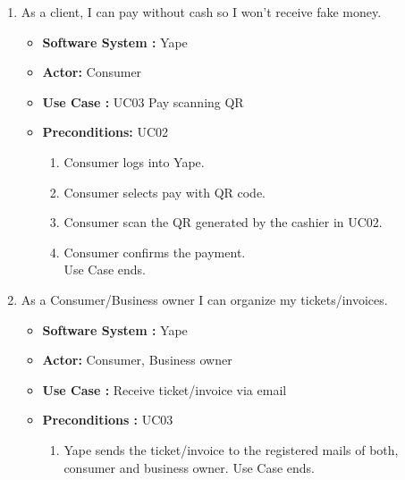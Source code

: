 \documentclass{article}
\begin{document}
\begin{enumerate}
    
   \item  As a client, I can pay without cash so I won't receive fake money. 
   \begin{itemize}
        \item \textbf{Software System : } Yape 
        \item \textbf{Actor: } Consumer 
        \item \textbf{Use Case : } UC03 Pay scanning QR
        \item \textbf{Preconditions: } UC02
	\begin{enumerate}
            \item Consumer logs into Yape.
	    \item Consumer selects pay with QR code.
	    \item Consumer scan the QR generated by the cashier in UC02.
	    \item Consumer confirms the payment.\\
            Use Case ends.
        \end{enumerate}
    \end{itemize}

   \item As a Consumer/Business owner I can organize my tickets/invoices.
   \begin{itemize}
        \item \textbf{Software System :} Yape 
        \item \textbf{Actor: } Consumer, Business owner
        \item \textbf{Use Case : } Receive ticket/invoice via email
        \item \textbf{Preconditions : } UC03
	\begin{enumerate}
            \item Yape sends the ticket/invoice to the registered mails of both, consumer and business owner.
            Use Case ends.
       \end{enumerate}
    \end{itemize}
    
    
\end{enumerate}
\end{document}
